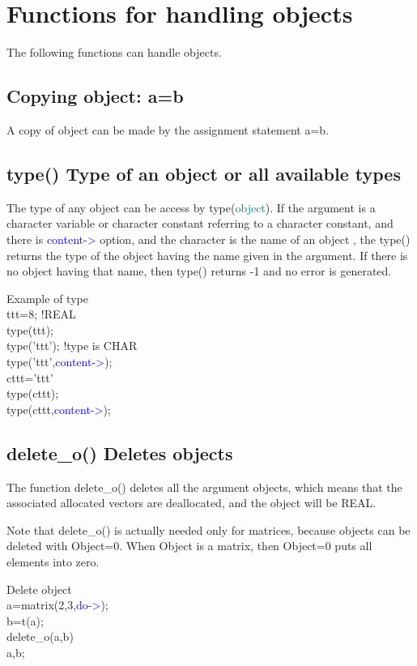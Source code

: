 \section{Functions for handling objects}
\label{objects}
The following functions can handle objects.
\subsection{	Copying object: a=b}
\label{copy}
A copy of object can be made by the assignment statement a=b.
\subsection{\textcolor{VioletRed}{type}() Type of an object or all available types}
\label{type}
The type of any object can be access by \textcolor{VioletRed}{type}(\textcolor{teal}{object}).
If the argument is a character variable or character constant referring to
a character constant, and there is \textcolor{blue}{content->} option, and the character is the name of
an object , the \textcolor{VioletRed}{type}() returns the type of the object having the name given in the argument.
If there is no object having that name, then \textcolor{VioletRed}{type}() returns -1 and no error is generated.
\begin{example}[typeex]Example of type\\
\label{typeex}
ttt=8;   !REAL\\
\textcolor{VioletRed}{type}(ttt);\\
\textcolor{VioletRed}{type}('ttt'); !type is CHAR\\
\textcolor{VioletRed}{type}('ttt',\textcolor{blue}{content->});\\
cttt='ttt'\\
\textcolor{VioletRed}{type}(cttt);\\
\textcolor{VioletRed}{type}(cttt,\textcolor{blue}{content->});
\end{example}
\subsection{\textcolor{VioletRed}{delete\_o}() Deletes objects}
\label{delete_o}
The function \textcolor{VioletRed}{delete\_o}() deletes all the argument objects, which means that the
associated allocated vectors are deallocated, and the object will be REAL.
\begin{note}
Note that \textcolor{VioletRed}{delete\_o}() is actually needed only for matrices, because objects
can be deleted with Object=0. When Object is a matrix, then Object=0 puts all elements
into zero.
\end{note}
\begin{example}[deleteoex]Delete object\\
\label{deleteoex}
a=\textcolor{VioletRed}{matrix}(2,3,\textcolor{blue}{do->});\\
b=\textcolor{VioletRed}{t}(a);\\
\textcolor{VioletRed}{delete\_o}(a,b)\\
a,b;
\end{example}
